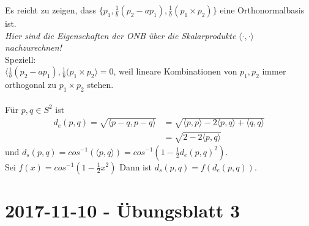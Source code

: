 \begin{problem*}[1b]
Es reicht zu zeigen, dass $\{ p_1, \frac{1}{b}(p_2 - ap_1), \frac{1}{b}(p_1 \times p_2) \}$ eine Orthonormalbasis ist.\\
\emph{Hier sind die Eigenschaften der ONB über die Skalarprodukte} $\langle \cdot , \cdot \rangle$ \emph{nachzurechnen!}\\
Speziell: \\
$\langle \frac{1}{b}(p_2 - ap_1), \frac{1}{b}(p_1 \times p_2\rangle = 0$, weil lineare Kombinationen von $ p_1, p_2 $ immer orthogonal zu $ p_1 \times p_2 $ stehen.\\
\\
Für $ p,q \in S^2$ ist 
\begin{align*}
	d_e(p,q) = \sqrt{ \langle p-q,p-q \rangle } &= \sqrt{ \langle p,p \rangle - 2\langle p,q \rangle + \langle q,q \rangle } \\
	&=\sqrt{ 2 - 2\langle p,q \rangle }
\end{align*}
und $d_s(p,q) = cos^{ -1 } (\langle p,q \rangle) = cos^{ -1 }(1- \frac{1}{2}d_e(p,q)^2)$.\\
Sei $f(x) = cos^{ -1 }(1- \frac{1}{2}x^2)$ Dann ist $ d_s(p,q) = f(d_e(p,q)) $.\\

\end{problem*}
\section{2017-11-10 - Übungsblatt 3}

